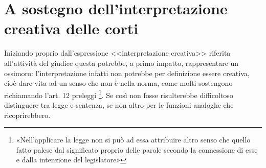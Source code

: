 \section{A sostegno dell'interpretazione creativa delle corti}
Iniziando proprio dall'espressione <<interpretazione creativa>> riferita all’attività del giudice questa potrebbe, a primo impatto, rappresentare un ossimoro: l’interpretazione infatti non potrebbe per definizione essere creativa, cioè dare vita ad un senso che non è nella norma, come molti sostengono richiamando l’art. 12 preleggi \footnote{«Nell’applicare la legge non si può ad essa attribuire altro senso che quello fatto palese dal significato proprio delle parole secondo la connessione di esse e dalla intenzione del legislatore»}. Se così non fosse risulterebbe difficoltoso distinguere tra legge e sentenza, se non altro per le funzioni analoghe che ricoprirebbero.

